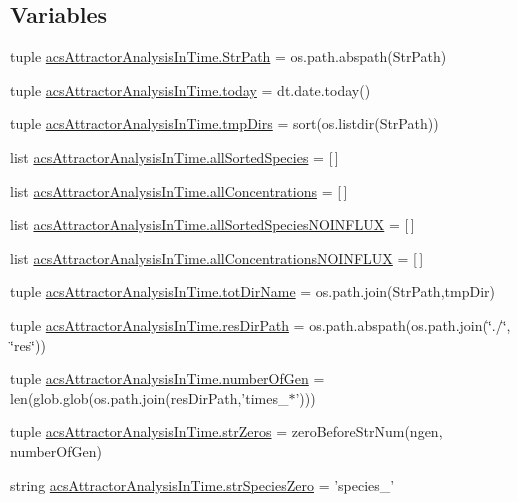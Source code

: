 \subsection*{Variables}
\begin{DoxyCompactItemize}
\item 
tuple \hyperlink{a00091_a1d168f4d444ea1d02f186a7568344fba}{acs\-Attractor\-Analysis\-In\-Time.\-Str\-Path} = os.\-path.\-abspath(Str\-Path)
\item 
tuple \hyperlink{a00091_af30cd903eabfe4c9167f2a5d0062a4ce}{acs\-Attractor\-Analysis\-In\-Time.\-today} = dt.\-date.\-today()
\item 
tuple \hyperlink{a00091_a4f312756a4e405be853b0a84be7e2e54}{acs\-Attractor\-Analysis\-In\-Time.\-tmp\-Dirs} = sort(os.\-listdir(Str\-Path))
\item 
list \hyperlink{a00091_aceddba8afb0eb0cc7ba102491a9a3c30}{acs\-Attractor\-Analysis\-In\-Time.\-all\-Sorted\-Species} = \mbox{[}$\,$\mbox{]}
\item 
list \hyperlink{a00091_a8c439282d32e80d2e2d4c02cc36f1101}{acs\-Attractor\-Analysis\-In\-Time.\-all\-Concentrations} = \mbox{[}$\,$\mbox{]}
\item 
list \hyperlink{a00091_a48013e92108a94a85d1e32c2397eb37c}{acs\-Attractor\-Analysis\-In\-Time.\-all\-Sorted\-Species\-N\-O\-I\-N\-F\-L\-U\-X} = \mbox{[}$\,$\mbox{]}
\item 
list \hyperlink{a00091_af6dd7a5a396717328c091d96d629af7c}{acs\-Attractor\-Analysis\-In\-Time.\-all\-Concentrations\-N\-O\-I\-N\-F\-L\-U\-X} = \mbox{[}$\,$\mbox{]}
\item 
tuple \hyperlink{a00091_aeed4ca0c266fb5e31aebbbbe2f389378}{acs\-Attractor\-Analysis\-In\-Time.\-tot\-Dir\-Name} = os.\-path.\-join(Str\-Path,tmp\-Dir)
\item 
tuple \hyperlink{a00091_a28ca19f0f566396ef664e068a41a2837}{acs\-Attractor\-Analysis\-In\-Time.\-res\-Dir\-Path} = os.\-path.\-abspath(os.\-path.\-join(\char`\"{}./\char`\"{}, \char`\"{}res\char`\"{}))
\item 
tuple \hyperlink{a00091_a28cc280ff54c726bd790cf781d3bab8c}{acs\-Attractor\-Analysis\-In\-Time.\-number\-Of\-Gen} = len(glob.\-glob(os.\-path.\-join(res\-Dir\-Path,'times\-\_\-$\ast$')))
\item 
tuple \hyperlink{a00091_a9401cc8fb642e77e034e21ef9babcb24}{acs\-Attractor\-Analysis\-In\-Time.\-str\-Zeros} = zero\-Before\-Str\-Num(ngen, number\-Of\-Gen)
\item 
string \hyperlink{a00091_aea2d717887265b294c623099d2495d4f}{acs\-Attractor\-Analysis\-In\-Time.\-str\-Species\-Zero} = 'species\-\_\-'

\end{DoxyCompactItemize}

